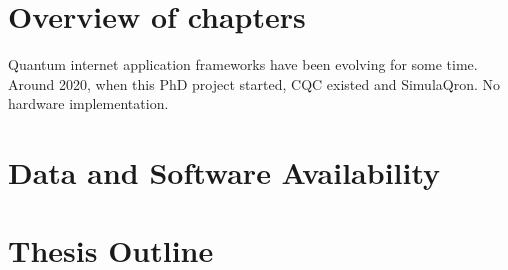 \section{Overview of chapters}
Quantum internet application frameworks have been evolving for some time.
Around 2020, when this PhD project started, CQC existed and SimulaQron.
No hardware implementation.


\section{Data and Software Availability}
\lipsum[51]


\section{Thesis Outline}
\lipsum[52]


\begin{xstretch}
\printbibliography[heading=subbibintoc,title={References},notcategory=noprint]
\end{xstretch}

